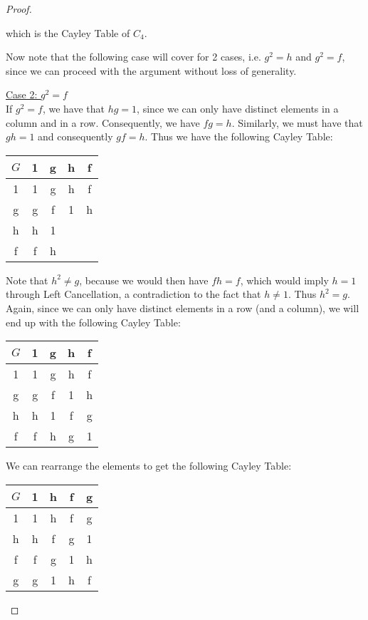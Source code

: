 \begin{proof}
\begin{enumerate}
          which is the Cayley Table of $C_4$.

          Now note that the following case will cover for 2 cases, i.e. $g^2 = h$ and $g^2 = f$, since we can proceed with the argument without loss of generality.

          \underline{Case 2: $g^2 = f$} \\
          If $g^2 = f$, we have that $hg = 1$, since we can only have distinct elements in a column and in a row. Consequently, we have $fg = h$. Similarly, we must have that $gh = 1$ and consequently $gf = h$. Thus we have the following Cayley Table:

          \begin{center}
            \begin{tabular}{c|c|c|c|c}
              $G$   & 1 & g & h & f \\
              \hline
              1     & 1 & g & h & f \\
              g     & g & f & 1 & h \\
              h     & h & 1 &   &   \\
              f     & f & h &   &  
            \end{tabular}
          \end{center}

          Note that $h^2 \neq g$, because we would then have $fh = f$, which would imply $h = 1$ through Left Cancellation, a contradiction to the fact that $h \neq 1$. Thus $h^2 = g$. Again, since we can only have distinct elements in a row (and a column), we will end up with the following Cayley Table:

          \begin{center}
            \begin{tabular}{c|c|c|c|c}
              $G$   & 1 & g & h & f \\
              \hline
              1     & 1 & g & h & f \\
              g     & g & f & 1 & h \\
              h     & h & 1 & f & g \\
              f     & f & h & g & 1
            \end{tabular}
          \end{center}

          We can rearrange the elements to get the following Cayley Table:

          \begin{center}
            \begin{tabular}{c|c|c|c|c}
              $G$   & 1 & h & f & g \\
              \hline
              1     & 1 & h & f & g \\
              h     & h & f & g & 1 \\
              f     & f & g & 1 & h \\
              g     & g & 1 & h & f
            \end{tabular}
          \end{center}


\end{enumerate}
\end{proof}
